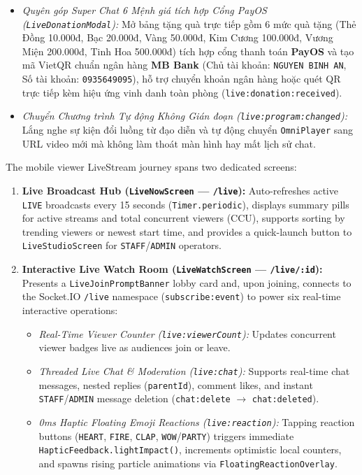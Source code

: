 {\begin{enumerate}[leftmargin=*,itemsep=2pt]
\begin{itemize}[leftmargin=*,itemsep=1pt]
    \item \emph{Quyên góp Super Chat 6 Mệnh giá tích hợp Cổng PayOS (\texttt{LiveDonationModal}):} Mở bảng tặng quà trực tiếp gồm 6 mức quà tặng (Thẻ Đồng 10.000đ, Bạc 20.000đ, Vàng 50.000đ, Kim Cương 100.000đ, Vương Miện 200.000đ, Tinh Hoa 500.000đ) tích hợp cổng thanh toán \textbf{PayOS} và tạo mã VietQR chuẩn ngân hàng \textbf{MB Bank} (Chủ tài khoản: \texttt{NGUYEN BINH AN}, Số tài khoản: \texttt{0935649095}), hỗ trợ chuyển khoản ngân hàng hoặc quét QR trực tiếp kèm hiệu ứng vinh danh toàn phòng (\texttt{live:donation:received}).
    \item \emph{Chuyển Chương trình Tự động Không Gián đoạn (\texttt{live:program:changed}):} Lắng nghe sự kiện đổi luồng từ đạo diễn và tự động chuyển \texttt{OmniPlayer} sang URL video mới mà không làm thoát màn hình hay mất lịch sử chat.
  \end{itemize}
\end{enumerate}
}{
The mobile viewer LiveStream journey spans two dedicated screens:
\begin{enumerate}[leftmargin=*,itemsep=2pt]
  \item \textbf{Live Broadcast Hub (\texttt{LiveNowScreen} --- \texttt{/live}):} Auto-refreshes active \texttt{LIVE} broadcasts every 15 seconds (\texttt{Timer.periodic}), displays summary pills for active streams and total concurrent viewers (CCU), supports sorting by trending viewers or newest start time, and provides a quick-launch button to \texttt{LiveStudioScreen} for \texttt{STAFF}/\texttt{ADMIN} operators.
  \item \textbf{Interactive Live Watch Room (\texttt{LiveWatchScreen} --- \texttt{/live/:id}):} Presents a \texttt{LiveJoinPromptBanner} lobby card and, upon joining, connects to the Socket.IO \texttt{/live} namespace (\texttt{subscribe:event}) to power six real-time interactive operations:
  \begin{itemize}[leftmargin=*,itemsep=1pt]
    \item \emph{Real-Time Viewer Counter (\texttt{live:viewerCount}):} Updates concurrent viewer badges live as audiences join or leave.
    \item \emph{Threaded Live Chat \& Moderation (\texttt{live:chat}):} Supports real-time chat messages, nested replies (\texttt{parentId}), comment likes, and instant \texttt{STAFF}/\texttt{ADMIN} message deletion (\texttt{chat:delete} $\rightarrow$ \texttt{chat:deleted}).
    \item \emph{0ms Haptic Floating Emoji Reactions (\texttt{live:reaction}):} Tapping reaction buttons (\texttt{HEART}, \texttt{FIRE}, \texttt{CLAP}, \texttt{WOW}/\texttt{PARTY}) triggers immediate \texttt{HapticFeedback.lightImpact()}, increments optimistic local counters, and spawns rising particle animations via \texttt{FloatingReactionOverlay}.

\end{itemize}
\end{enumerate}}
